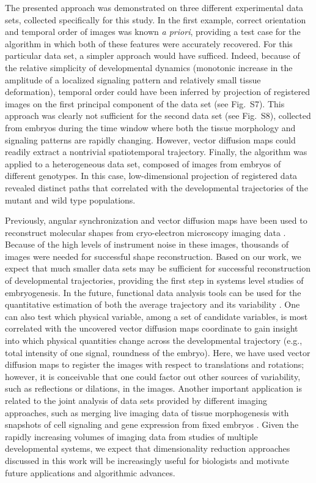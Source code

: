 \documentclass{pnastwo}
\newcommand{\fig}[0]{Fig.}
\begin{document}
\begin{article}
The presented approach was demonstrated on three different experimental data sets, collected specifically for this study. 
%
In the first example, correct orientation and temporal order of images was known {\it a priori}, providing a test case for the algorithm in which both of these features were accurately recovered. 
%
For this particular data set, a simpler approach would have sufficed. 
%
Indeed, because of the relative simplicity of developmental dynamics (monotonic increase in the amplitude of a localized signaling pattern and relatively small tissue deformation), temporal order could have been inferred by projection of registered images on the first principal component of the data set (see \fig~S7). 
%
This approach was clearly not sufficient for the second data set (see \fig~S8), collected from embryos during the time window where both the tissue morphology and signaling patterns are rapidly changing.  
%
However, vector diffusion maps could readily extract a nontrivial spatiotemporal trajectory. 
%
Finally, the algorithm was applied to a heterogeneous data set, composed of images from embryos of different genotypes. 
%
In this case, low-dimensional projection of registered data revealed distinct paths that correlated with the developmental trajectories of the mutant and wild type populations. 

Previously, angular synchronization and vector diffusion maps have been used to reconstruct molecular shapes from cryo-electron microscopy imaging data \cite{singer2012vector, singer2011three}. 
%
Because of the high levels of instrument noise in these images, thousands of images were needed for successful shape reconstruction. 
%
Based on our work, we expect that much smaller data sets may be sufficient for successful reconstruction of developmental trajectories, providing the first step in systems level studies of embryogenesis. 
%
In the future, functional data analysis tools can be used for the quantitative estimation of both the average trajectory and its variability \cite{silverman2005functional}.  
%
One can also test which physical variable, among a set of candidate variables, is most correlated with the uncovered vector diffusion maps coordinate to gain insight into which physical quantities change across the developmental trajectory (e.g., total intensity of one signal, roundness of the embryo).
%
Here, we have used vector diffusion maps to register the images with respect to translations and rotations; however, it is conceivable that one could factor out other sources of variability, such as reflections or dilations, in the images.
%
Another important application is related to the joint analysis of data sets provided by different imaging approaches, such as merging live imaging data of tissue morphogenesis with snapshots of cell signaling and gene expression from fixed embryos \cite{krzic2012multiview, ichikawa2014live, rubel2010coupling}. 
%
Given the rapidly increasing volumes of imaging data from studies of multiple developmental systems, we expect that dimensionality reduction approaches discussed in this work will be increasingly useful for biologists and motivate future applications and algorithmic advances. 
  



\end{article}
\end{document}

